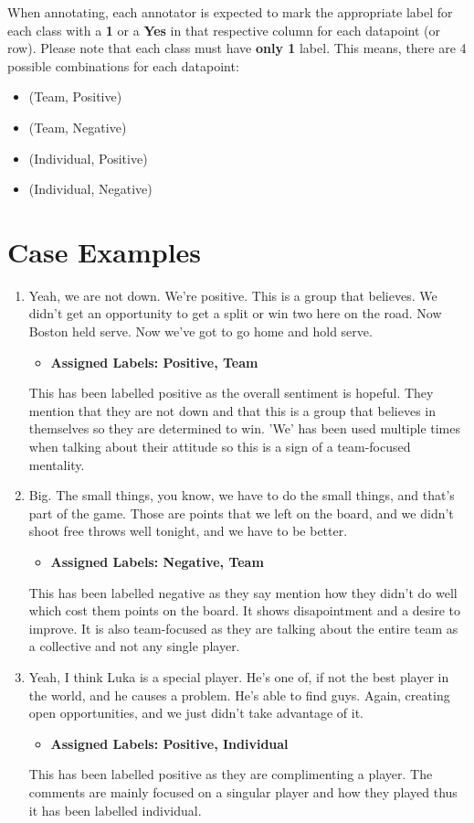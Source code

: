 \documentclass[titlepage]{article}
\begin{document}
When annotating, each annotator is expected to mark the appropriate label for each class with a \textbf{1} or 
a \textbf{Yes} in that respective column for each datapoint (or row). Please note that each class must have 
\textbf{only 1} label. This means, there are 4 possible combinations for each datapoint:
\begin{itemize}
    \item (Team, Positive)
    \item (Team, Negative)
    \item (Individual, Positive)
    \item (Individual, Negative)
\end{itemize}

\section{Case Examples}
\begin{enumerate}
    \item Yeah, we are not down. We're positive. This is a group that believes. We didn't get an opportunity to get a 
    split or win two here on the road. Now Boston held serve. Now we've got to go home and hold serve.
    \begin{itemize}
        \item \textbf{Assigned Labels: Positive, Team}
    \end{itemize}
    This has been labelled positive as the overall sentiment is hopeful. They mention that they are not down and that this is 
    a group that believes in themselves so they are determined to win. 'We' has been used multiple times when talking about 
    their attitude so this is a sign of a team-focused mentality.

    \item Big. The small things, you know, we have to do the small things, and that's part of the game. Those are points 
    that we left on the board, and we didn't shoot free throws well tonight, and we have to be better.
    \begin{itemize}
        \item \textbf{Assigned Labels: Negative, Team}
    \end{itemize}
    This has been labelled negative as they say mention how they didn't do well which cost them points on the board. It shows 
    disapointment and a desire to improve. It is also team-focused as they are talking about the entire team as a collective 
    and not any single player.

    \item Yeah, I think Luka is a special player. He's one of, if not the best player in the world, and he causes a problem. 
    He's able to find guys. Again, creating open opportunities, and we just didn't take advantage of it.
    \begin{itemize}
        \item \textbf{Assigned Labels: Positive, Individual}
    \end{itemize}
    This has been labelled positive as they are complimenting a player. The comments are mainly focused on a singular player 
    and how they played thus it has been labelled individual.
\end{enumerate}
\end{document}
